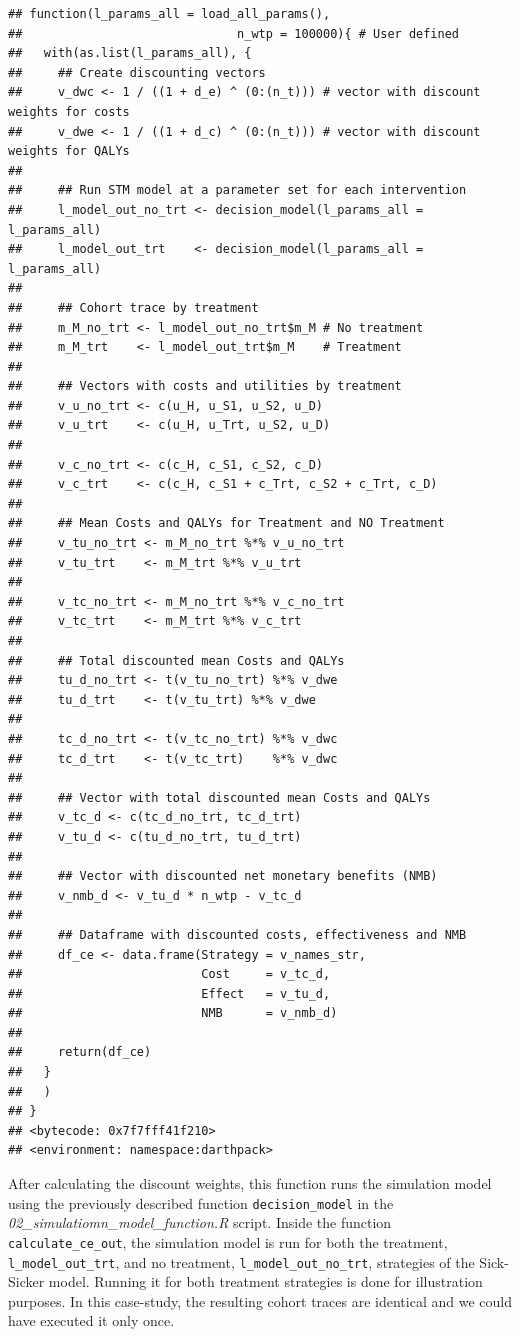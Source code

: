 \documentclass[]{book}
\begin{document}
\begin{verbatim}
## function(l_params_all = load_all_params(), 
##                              n_wtp = 100000){ # User defined
##   with(as.list(l_params_all), {
##     ## Create discounting vectors
##     v_dwc <- 1 / ((1 + d_e) ^ (0:(n_t))) # vector with discount weights for costs
##     v_dwe <- 1 / ((1 + d_c) ^ (0:(n_t))) # vector with discount weights for QALYs
##     
##     ## Run STM model at a parameter set for each intervention
##     l_model_out_no_trt <- decision_model(l_params_all = l_params_all)
##     l_model_out_trt    <- decision_model(l_params_all = l_params_all)
##     
##     ## Cohort trace by treatment
##     m_M_no_trt <- l_model_out_no_trt$m_M # No treatment
##     m_M_trt    <- l_model_out_trt$m_M    # Treatment
##     
##     ## Vectors with costs and utilities by treatment
##     v_u_no_trt <- c(u_H, u_S1, u_S2, u_D)
##     v_u_trt    <- c(u_H, u_Trt, u_S2, u_D)
##     
##     v_c_no_trt <- c(c_H, c_S1, c_S2, c_D)
##     v_c_trt    <- c(c_H, c_S1 + c_Trt, c_S2 + c_Trt, c_D)
##     
##     ## Mean Costs and QALYs for Treatment and NO Treatment
##     v_tu_no_trt <- m_M_no_trt %*% v_u_no_trt
##     v_tu_trt    <- m_M_trt %*% v_u_trt
##     
##     v_tc_no_trt <- m_M_no_trt %*% v_c_no_trt
##     v_tc_trt    <- m_M_trt %*% v_c_trt
##     
##     ## Total discounted mean Costs and QALYs
##     tu_d_no_trt <- t(v_tu_no_trt) %*% v_dwe 
##     tu_d_trt    <- t(v_tu_trt) %*% v_dwe
##     
##     tc_d_no_trt <- t(v_tc_no_trt) %*% v_dwc
##     tc_d_trt    <- t(v_tc_trt)    %*% v_dwc
##     
##     ## Vector with total discounted mean Costs and QALYs
##     v_tc_d <- c(tc_d_no_trt, tc_d_trt)
##     v_tu_d <- c(tu_d_no_trt, tu_d_trt)
##     
##     ## Vector with discounted net monetary benefits (NMB)
##     v_nmb_d <- v_tu_d * n_wtp - v_tc_d
##     
##     ## Dataframe with discounted costs, effectiveness and NMB
##     df_ce <- data.frame(Strategy = v_names_str,
##                         Cost     = v_tc_d,
##                         Effect   = v_tu_d,
##                         NMB      = v_nmb_d)
##     
##     return(df_ce)
##   }
##   )
## }
## <bytecode: 0x7f7fff41f210>
## <environment: namespace:darthpack>
\end{verbatim}

After calculating the discount weights, this function runs the
simulation model using the previously described function
\texttt{decision\_model} in the
\emph{02\_simulatiomn\_model\_function.R} script. Inside the function
\texttt{calculate\_ce\_out}, the simulation model is run for both the
treatment, \texttt{l\_model\_out\_trt}, and no treatment,
\texttt{l\_model\_out\_no\_trt}, strategies of the Sick-Sicker model.
Running it for both treatment strategies is done for illustration
purposes. In this case-study, the resulting cohort traces are identical
and we could have executed it only once.
\end{document}
